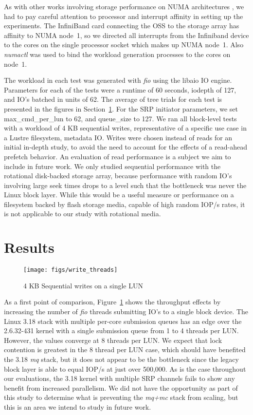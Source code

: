 \documentclass[conference]{IEEEtran}
\begin{document}
As with other works involving storage performance on NUMA architectures
\cite{zheng13, shelton13}, we had to pay careful attention to
processor and interrupt affinity in setting up the experiments. The InfiniBand card connecting
the OSS to the storage array has affinity to NUMA 
node~1, so we directed all interrupts from the Infiniband device to the cores on the single
processor socket which makes up NUMA node~1. Also \emph{numactl} was
used to bind the workload generation processes to the cores on node~1.

The workload in each test was generated with \emph{fio} \cite{www:fio} using the libaio IO engine.
Parameters for each of the tests were a
runtime of 60 seconds, iodepth of 127, and IO's batched in units of 62. The average of tree trials for each test
is presented in the figures in Section~\ref{sec:results}.
For the SRP initiator parameters, we set max\_cmd\_per\_lun to 62, and queue\_size to 127.  We ran all block-level
tests with a workload of 4 KB sequential writes, representative of a specific use case in a Lustre filesystem,
metadata IO. Writes were chosen instead of reads for an initial in-depth study, to avoid the need to account for
the effects of a read-ahead prefetch behavior. An evaluation of read performance is a subject we aim to include in
future work. We only studied sequential performance with the rotational disk-backed storage array, 
because performance with random IO's involving large seek times drops to a level such that the 
bottleneck was never the Linux block layer.
While this would be a useful measure or performance on a filesystem
backed by flash storage media, capable of high random IOP/s rates, it is not applicable to our study
with rotational media.

\section{Results}
\label{sec:results}


\begin{figure}[!t]
\centering
\texttt{[image: figs/write\_threads]}
\caption{4 KB Sequential writes on a single LUN}
\label{fig_threads}
\end{figure}

As a first point of comparison, Figure~\ref{fig_threads} shows the throughput effects by increasing the number of
\emph{fio} threads submitting IO's to a single block device. The Linux 3.18 stack with multiple per-core submission
queues has an edge over the 2.6.32-431 kernel with a single submission queue from 1 to 4 threads per LUN.
However, the values converge at 8 threads per LUN. We expect that lock contention is greatest in the 8 thread per
LUN case, which should have benefited the 3.18 \emph{mq} stack, but it does not appear to be the bottleneck since
the legacy block layer is able to equal IOP/s at just over 500,000. As is the case throughout our evaluations, the
3.18 kernel with multiple SRP channels fails to show any benefit from increased parallelism. We did not have
the opportunity as part of this study to determine what is preventing the \emph{mq+mc} stack from scaling, but
this is an area we intend to study in future work.
\end{document}
